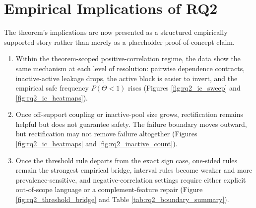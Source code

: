 \section{Empirical Implications of RQ2}

The theorem's implications are now presented as a structured empirically supported story rather than merely as a placeholder proof-of-concept claim.
\begin{enumerate}
    \item Within the theorem-scoped positive-correlation regime, the data show the same mechanism at each level of resolution: pairwise dependence contracts, inactive-active leakage drops, the active block is easier to invert, and the empirical safe frequency $P(\Theta<1)$ rises (Figures \ref{fig:rq2_ic_sweep} and \ref{fig:rq2_ic_heatmaps}).
    \item Once off-support coupling or inactive-pool size grows, rectification remains helpful but does not guarantee safety. The failure boundary moves outward, but rectification may not remove failure altogether (Figures \ref{fig:rq2_ic_heatmaps} and \ref{fig:rq2_inactive_count}).
    \item Once the threshold rule departs from the exact sign case, one-sided rules remain the strongest empirical bridge, interval rules become weaker and more prevalence-sensitive, and negative-correlation settings require either explicit out-of-scope language or a complement-feature repair (Figure \ref{fig:rq2_threshold_bridge} and Table \ref{tab:rq2_boundary_summary}).
\end{enumerate}

